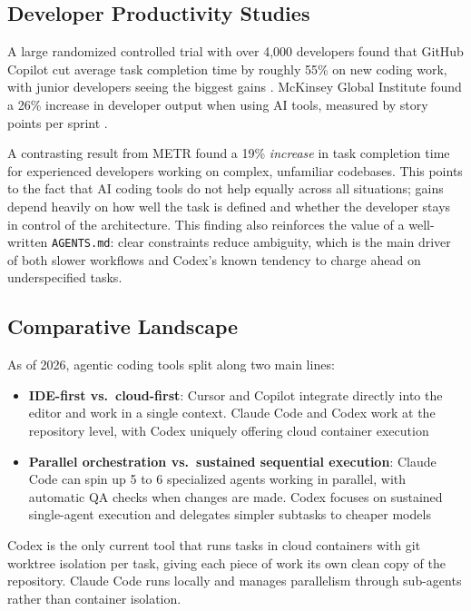 \documentclass[conference]{IEEEtran}
\begin{document}
\subsection{Developer Productivity Studies}
A large randomized controlled trial with over 4,000 developers found that GitHub Copilot cut average task completion time by roughly 55\% on new coding work, with junior developers seeing the biggest gains \cite{peng2023copilot}. McKinsey Global Institute found a 26\% increase in developer output when using AI tools, measured by story points per sprint \cite{mckinsey2023}.

A contrasting result from METR \cite{metr2025} found a 19\% \textit{increase} in task completion time for experienced developers working on complex, unfamiliar codebases. This points to the fact that AI coding tools do not help equally across all situations; gains depend heavily on how well the task is defined and whether the developer stays in control of the architecture. This finding also reinforces the value of a well-written \texttt{AGENTS.md}: clear constraints reduce ambiguity, which is the main driver of both slower workflows and Codex's known tendency to charge ahead on underspecified tasks.

\subsection{Comparative Landscape}
As of 2026, agentic coding tools split along two main lines:
\begin{itemize}
    \item \textbf{IDE-first vs.\ cloud-first}: Cursor and Copilot integrate directly into the editor and work in a single context. Claude Code and Codex work at the repository level, with Codex uniquely offering cloud container execution
    \item \textbf{Parallel orchestration vs.\ sustained sequential execution}: Claude Code can spin up 5 to 6 specialized agents working in parallel, with automatic QA checks when changes are made. Codex focuses on sustained single-agent execution and delegates simpler subtasks to cheaper models
\end{itemize}

Codex is the only current tool that runs tasks in cloud containers with git worktree isolation per task, giving each piece of work its own clean copy of the repository. Claude Code runs locally and manages parallelism through sub-agents rather than container isolation.
\end{document}
